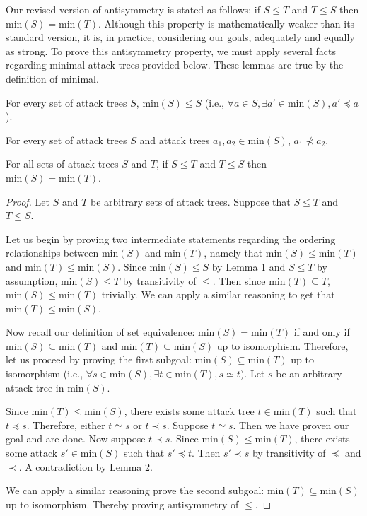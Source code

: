 \documentclass[runningheads]{llncs}
\theoremstyle{definition}
\begin{document}
Our revised version of antisymmetry is stated as follows: if $S \le T$ and $T \le S$ then $\text{min}(S) = \text{min}(T)$. Although this property is mathematically weaker than its standard version, it is, in practice, considering our goals, adequately and equally as strong. To prove this antisymmetry property, we must apply several facts regarding minimal attack trees provided below. These lemmas are true by the definition of minimal.

\begin{lemma}
  For every set of attack trees $S$, $\text{min}(S) \le S$ (i.e., $\forall a \in S, \exists a' \in \text{min}(S), a' \preceq a$).
\end{lemma}

\begin{lemma}
  For every set of attack trees $S$ and attack trees $a_1, a_2 \in \text{min}(S)$, $a_1 \nprec a_2$.
\end{lemma}

\begin{theorem}
  For all sets of attack trees $S$ and $T$, if $S \le T$ and $T \le S$ then $\text{min}(S) = \text{min}(T)$. 
\end{theorem}
\begin{proof}
  Let $S$ and $T$ be arbitrary sets of attack trees. Suppose that $S \le T$ and $T \le S$. 
  
  Let us begin by proving two intermediate statements regarding the ordering relationships between $\text{min}(S)$ and $\text{min}(T)$, namely that $\text{min}(S) \leq \text{min}(T)$ and $\text{min}(T) \leq \text{min}(S)$. Since $\text{min}(S) \leq S$ by Lemma 1 and $S \leq T$ by assumption, $\text{min}(S) \leq T$ by transitivity of $\leq$. Then since $\text{min}(T) \subseteq T$, $\text{min}(S) \leq \text{min}(T)$ trivially. We can apply a similar reasoning to get that $\text{min}(T) \leq \text{min}(S)$.

  Now recall our definition of set equivalence: $\text{min}(S) = \text{min}(T)$ if and only if $\text{min}(S) \subseteq \text{min}(T)$ and $\text{min}(T) \subseteq \text{min}(S)$ up to isomorphism. Therefore, let us proceed by proving the first subgoal: $\text{min}(S) \subseteq \text{min}(T)$ up to isomorphism (i.e., $\forall s \in \text{min}(S), \exists t \in \text{min}(T), s \simeq t)$.  Let $s$ be an arbitrary attack tree in $\text{min}(S)$. 

  Since $\text{min}(T) \leq \text{min}(S)$, there exists some attack tree $t \in \text{min}(T)$ such that $t \preceq s$. Therefore, either $t \simeq s$ or $t \prec s$. Suppose $t \simeq s$. Then we have proven our goal and are done. Now suppose $t \prec s$. Since $\text{min}(S) \leq \text{min}(T)$, there exists some attack $s' \in \text{min}(S)$ such that $s' \preceq t$. Then $s' \prec s$ by transitivity of $\preceq$ and $\prec$. A contradiction by Lemma 2.
  
  We can apply a similar reasoning prove the second subgoal: $\text{min}(T) \subseteq \text{min}(S)$ up to isomorphism. Thereby proving antisymmetry of $\leq$.
\end{proof}
\end{document}
